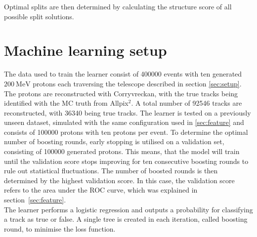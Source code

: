Optimal splits are then determined by calculating the structure score of all possible split solutions. \\

\section{Machine learning setup}
The data used to train the learner %
consist of 400000 events with ten generated $\SI{200}{\mega\eV}$ protons each
traversing the telescope described in section \ref{sec:setup}. The protons
are reconstructed with Corryvreckan, with the true tracks being identified with the MC truth from Allpix$^2$. A total number of 92546 tracks
are reconstructed, with 36340 being true tracks.
The learner is tested on a previously unseen dataset, simulated with the same configuration used in
\ref{sec:feature} and consists of 100000 protons with ten protons per event.
To determine the optimal number of boosting rounds, early stopping is utilised on a validation set, consisting of 100000 generated protons. This means, that
the model will train until the validation score stops improving for ten consecutive boosting rounds to rule out statistical fluctuations.
The number of boosted rounds is then determined by the highest validation score.
In this case, the validation score refers to the area under the ROC curve, which was explained in \mbox{section \ref{sec:feature}}. \\
The learner performs a logistic regression and outputs a probability for classifying a track as true or false.
A single tree is created in each iteration, called boosting round, to minimise the loss function.

